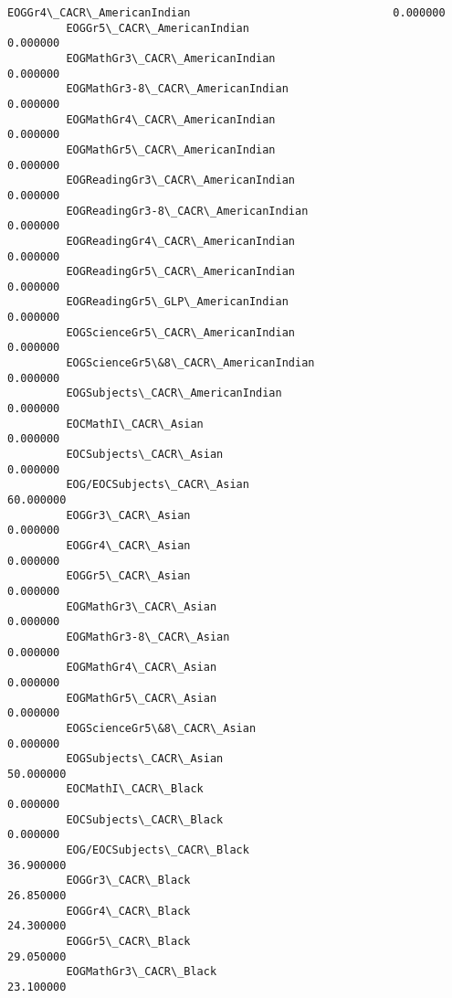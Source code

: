 \documentclass[11pt]{article}
\begin{document}
\begin{Verbatim}[commandchars=\\\{\}]
         EOGGr4\_CACR\_AmericanIndian                               0.000000   
         EOGGr5\_CACR\_AmericanIndian                               0.000000   
         EOGMathGr3\_CACR\_AmericanIndian                           0.000000   
         EOGMathGr3-8\_CACR\_AmericanIndian                         0.000000   
         EOGMathGr4\_CACR\_AmericanIndian                           0.000000   
         EOGMathGr5\_CACR\_AmericanIndian                           0.000000   
         EOGReadingGr3\_CACR\_AmericanIndian                        0.000000   
         EOGReadingGr3-8\_CACR\_AmericanIndian                      0.000000   
         EOGReadingGr4\_CACR\_AmericanIndian                        0.000000   
         EOGReadingGr5\_CACR\_AmericanIndian                        0.000000   
         EOGReadingGr5\_GLP\_AmericanIndian                         0.000000   
         EOGScienceGr5\_CACR\_AmericanIndian                        0.000000   
         EOGScienceGr5\&8\_CACR\_AmericanIndian                      0.000000   
         EOGSubjects\_CACR\_AmericanIndian                          0.000000   
         EOCMathI\_CACR\_Asian                                      0.000000   
         EOCSubjects\_CACR\_Asian                                   0.000000   
         EOG/EOCSubjects\_CACR\_Asian                              60.000000   
         EOGGr3\_CACR\_Asian                                        0.000000   
         EOGGr4\_CACR\_Asian                                        0.000000   
         EOGGr5\_CACR\_Asian                                        0.000000   
         EOGMathGr3\_CACR\_Asian                                    0.000000   
         EOGMathGr3-8\_CACR\_Asian                                  0.000000   
         EOGMathGr4\_CACR\_Asian                                    0.000000   
         EOGMathGr5\_CACR\_Asian                                    0.000000   
         EOGScienceGr5\&8\_CACR\_Asian                               0.000000   
         EOGSubjects\_CACR\_Asian                                  50.000000   
         EOCMathI\_CACR\_Black                                      0.000000   
         EOCSubjects\_CACR\_Black                                   0.000000   
         EOG/EOCSubjects\_CACR\_Black                              36.900000   
         EOGGr3\_CACR\_Black                                       26.850000   
         EOGGr4\_CACR\_Black                                       24.300000   
         EOGGr5\_CACR\_Black                                       29.050000   
         EOGMathGr3\_CACR\_Black                                   23.100000   

\end{Verbatim}
\end{document}
